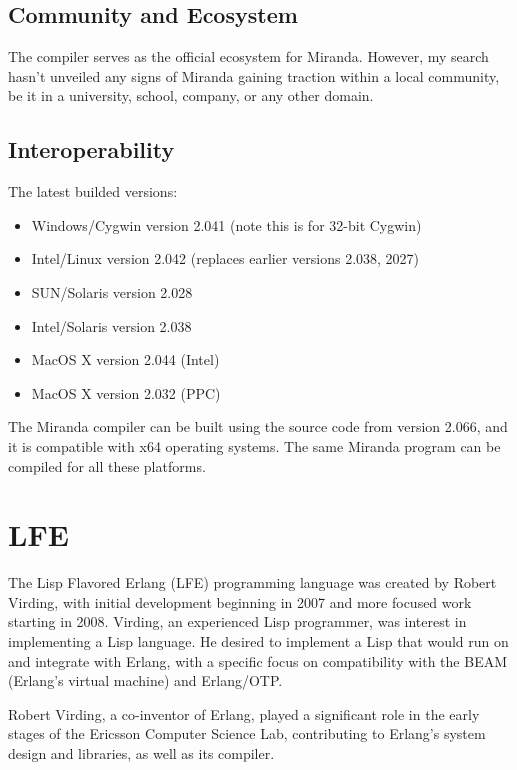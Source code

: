 \documentclass[
	article,			%
	11pt,				%
	oneside,			%
	a4paper,			%
	english,			%
	brazil,				%
	sumario=tradicional
	]{abntex2}
\begin{document}
\subsection*{Community and Ecosystem}

The compiler serves as the official ecosystem for Miranda. However, my search hasn't unveiled any signs of Miranda gaining traction within a local community, be it in a university, school, company, or any other domain. 

\subsection*{Interoperability}

The latest builded  versions:

\begin{itemize}
\item Windows/Cygwin version 2.041  (note this is for 32-bit Cygwin)
\item Intel/Linux version 2.042  (replaces earlier versions 2.038,  2027)
\item SUN/Solaris version 2.028
\item Intel/Solaris version 2.038
\item MacOS X version 2.044 (Intel)
\item MacOS X version 2.032 (PPC)
\end{itemize}

The Miranda compiler can be built using the source code from version 2.066, and it is compatible with x64 operating systems. The same Miranda program can be compiled for all these platforms.

\section*{LFE}

The Lisp Flavored Erlang (LFE) programming language was created by Robert Virding, with initial development beginning in 2007 and more focused work starting in 2008. Virding, an experienced Lisp programmer, was interest in implementing a Lisp language. He desired to implement a Lisp that would run on and integrate with Erlang, with a specific focus on compatibility with the BEAM (Erlang's virtual machine) and Erlang/OTP.

Robert Virding, a co-inventor of Erlang, played a significant role in the early stages of the Ericsson Computer Science Lab, contributing to Erlang's system design and libraries, as well as its compiler.
\end{document}
